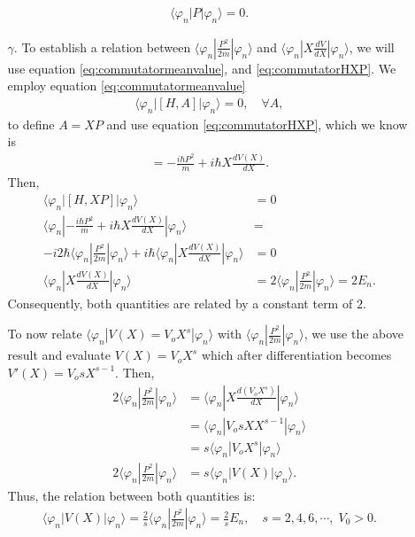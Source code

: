 \documentclass[letterpaper,11pt,twoside]{article}
\newcommand{\braket}[1]{\langle#1\rangle}
\begin{document}
\begin{enumerate}[itemsep=0pt,topsep=0pt,label=\alph*.]
\begin{enumerate}[itemsep=0pt,topsep=0pt]
    \begin{align}
      \braket{\varphi_n|P|\varphi_n}=0.
    \end{align}
    \item[$\gamma$.] To establish a relation between $\braket{\varphi_n|\frac{P^2}{2m}|\varphi_n}$ and $\braket{\varphi_n|X\frac{dV}{dX}|\varphi_n}$, we will use equation 
    \eqref{eq:commutatormeanvalue}, and \eqref{eq:commutatorHXP}. We employ equation \eqref{eq:commutatormeanvalue}
    \begin{align*}
      \braket{\varphi_n|[H,A]|\varphi_n}=0,\quad\forall A,
    \end{align*}
    to define $A=XP$ and use equation \eqref{eq:commutatorHXP}, which we know is
    \begin{align*}
      [H,XP]=-\frac{i\hbar P^2}{m}+i\hbar X\frac{dV(X)}{dX}.
    \end{align*}
    Then, 
    \begin{align*}
      \braket{\varphi_n|[H,XP]|\varphi_n}&=0\\
      \braket{\varphi_n|-\frac{i\hbar P^2}{m}+i\hbar X\frac{dV(X)}{dX}|\varphi_n}&=\\
      -i2\hbar\braket{\varphi_n|\frac{P^2}{2m}|\varphi_n}+i\hbar\braket{\varphi_n|X\frac{dV(X)}{dX}|\varphi_n}&=0\\
      \braket{\varphi_n|X\frac{dV(X)}{dX}|\varphi_n}&=2\braket{\varphi_n|\frac{P^2}{2m}|\varphi_n}=2E_n.
    \end{align*}
    Consequently, both quantities are related by a constant term of $2$.

    To now relate $\braket{\varphi_n|V(X)=V_oX^s|\varphi_n}$ with $\braket{\varphi_n|\frac{P^2}{2m}|\varphi_n}$, we use 
    the above result and evaluate $V(X)=V_oX^s$ which after differentiation becomes $V'(X)=V_osX^{s-1}$. Then,
    \begin{align*}
      2\braket{\varphi_n|\frac{P^2}{2m}|\varphi_n}&=\braket{\varphi_n|X\frac{d(V_oX^s)}{dX}|\varphi_n}\\
      &=\braket{\varphi_n|V_osXX^{s-1}|\varphi_n}\\
      &=s\braket{\varphi_n|V_oX^{s}|\varphi_n}\\
      2\braket{\varphi_n|\frac{P^2}{2m}|\varphi_n}&=s\braket{\varphi_n|V(X)|\varphi_n}.
    \end{align*}
    Thus, the relation between both quantities is:
    \begin{align}
      \braket{\varphi_n|V(X)|\varphi_n}=\frac{2}{s}\braket{\varphi_n|\frac{P^2}{2m}|\varphi_n}=\frac{2}{s}E_n,\quad s=2,4,6,\cdots,\;V_0>0.
    \end{align}
  \end{enumerate}
\end{enumerate}
\end{document}
